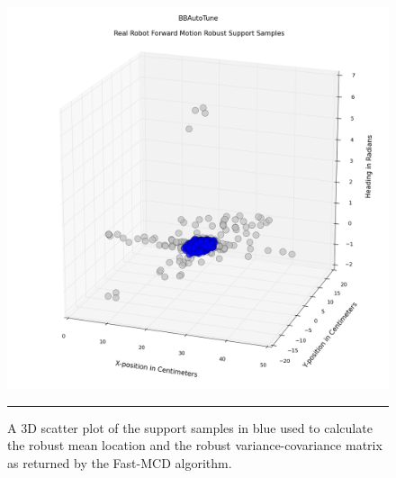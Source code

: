 
\begin{figure}[htbp]
\centering
\includegraphics[scale=0.5]{../Figures/Chapter4/real_robot_robust_samples.png}
\rule{35em}{0.5pt}
\caption[Real Robot Forward Motion Fast-MCD Support Samples]{A 3D scatter plot of the support samples in blue used to calculate the robust mean location and the robust variance-covariance matrix as returned by the Fast-MCD algorithm.}
\label{fig:robust_support_samples}
\end{figure}

